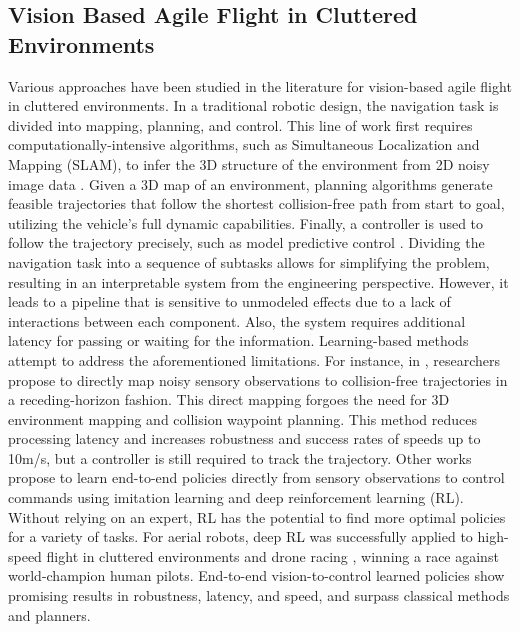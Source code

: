 \documentclass{article}
\begin{document}
\subsection{Vision Based Agile Flight in Cluttered Environments}
Various approaches have been studied in the literature for vision-based agile flight in cluttered environments. In a traditional robotic design, the navigation task is divided into mapping, planning, and control. This line of work first requires computationally-intensive algorithms, such as Simultaneous Localization and Mapping (SLAM), to infer the 3D structure of the environment from 2D noisy image data \cite{zhouSwarmMicroFlying2022, scaramuzzaVisionControlledMicroFlying2014}. Given a 3D map of an environment, planning algorithms generate feasible trajectories that follow the shortest collision-free path from start to goal, utilizing the vehicle’s full dynamic capabilities. Finally, a controller is used to follow the trajectory precisely, such as model predictive control \cite{falangaPAMPCPerceptionAwareModel2018}. Dividing the navigation task into a sequence of subtasks allows for simplifying the problem, resulting in an interpretable system from the engineering perspective. However, it leads to a pipeline that is sensitive to unmodeled effects due to a lack of interactions between each component. Also, the system requires additional latency for passing or waiting for the information. Learning-based methods attempt to address the aforementioned limitations. For instance, in \cite{loquercioLearningHighSpeedFlight2021}, researchers propose to directly map noisy sensory observations to collision-free trajectories in a receding-horizon fashion. This direct mapping forgoes the need for 3D environment mapping and collision waypoint planning. This method reduces processing latency and increases robustness and success rates of speeds up to 10m/s, but a controller is still required to track the trajectory. Other works propose to learn end-to-end policies directly from sensory observations to control commands using imitation learning and deep reinforcement learning (RL). Without relying on an expert, RL has the potential to find more optimal policies for a variety of tasks. For aerial robots, deep RL was successfully applied to high-speed flight in cluttered environments \cite{songLearningPerceptionAwareAgile2023} and drone racing \cite{kaufmannChampionlevelDroneRacing2023}, winning a race against world-champion human pilots. End-to-end vision-to-control learned policies show promising results in robustness, latency, and speed, and surpass classical methods and planners.
\end{document}
